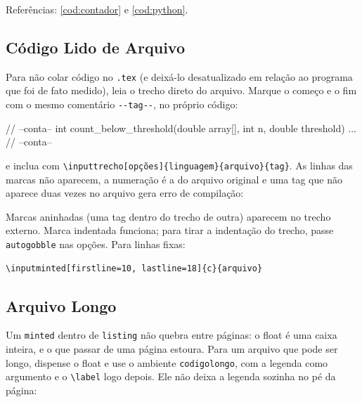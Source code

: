 Referências: \cref{cod:contador} e \cref{cod:python}.

\FloatBarrier
\subsection{Código Lido de Arquivo}

Para não colar código no \verb|.tex| (e deixá-lo desatualizado em relação ao
programa que foi de fato medido), leia o trecho direto do arquivo. Marque o
começo e o fim com o mesmo comentário \verb|--tag--|, no próprio código:

\begin{ccode}
// --conta--
int count_below_threshold(double array[], int n, double threshold) {
  ...
}
// --conta--
\end{ccode}

e inclua com \verb|\inputtrecho[opções]{linguagem}{arquivo}{tag}|. As linhas
das marcas não aparecem, a numeração é a do arquivo original e uma tag que não
aparece duas vezes no arquivo gera erro de compilação:

\begin{listing}[htbp]
  \caption{Função medida, lida de \texttt{codigos/count\_below\_threshold.c}}
  \label{cod:arquivo}
\end{listing}

Marcas aninhadas (uma tag dentro do trecho de outra) aparecem no trecho externo.
Marca indentada funciona; para tirar a indentação do trecho, passe
\verb|autogobble| nas opções. Para linhas fixas:

\begin{verbatim}
\inputminted[firstline=10, lastline=18]{c}{arquivo}
\end{verbatim}

\FloatBarrier
\subsection{Arquivo Longo}

Um \verb|minted| dentro de \verb|listing| não quebra entre páginas: o float é
uma caixa inteira, e o que passar de uma página estoura. Para um arquivo que
pode ser longo, dispense o float e use o ambiente \verb|codigolongo|, com a
legenda como argumento e o \verb|\label| logo depois. Ele não deixa a legenda
sozinha no pé da página:


